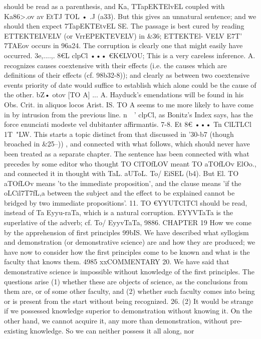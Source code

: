 {{{{{{{{{{{{{{{{{{{{{{{{{{{{{{{{{{{{{{{{{{{{{{{{{{{{{{{{{{{{{{{{{{{{{{{{{should be read as a parenthesis, and Ka, TTapEKTElvEL coupled with
Ka86>.ov av EtTJ TOL • .J (a33). But this gives an unnatural sentence;
and we should then expect 7TapEKTEtvEL SE. The passage is
best cured by reading ETTEKTELVELV (or VrrEPEKTE{VELV) in &36; ETTEKTEl-
VELV E7T' 7TAEov occurs in 96a24. The corruption is clearly one that
might easily have occurred.
3e,....,. 8€L clpCl ••• €K€LVOU; This is a very careless inference.
A. recognizes causes coextensive with their effects (i.e. the causes
which are definitions of their effects (cf. 98b32-8)); and clearly
as between two coextensive events priority of date would suffice
to establish which alone could be the cause of the other.
bZ• otov [TO A] ... A. Hayduck's emendations will be found in
his Obs. Crit. in aliquos locos Arist. IS. TO A seems to me more
likely to have come in by intrusion from the previous line.
n~~' clpCl, as Bonitz's Index says, has the force enunciati
modeste vel dubitanter affirmantis.
7-8. Et 8€ ••• Tn ClLTLCl 1T~"LW. This starts a topic distinct from
that discussed in '30-b7 (though broached in &25--{)) , and connected
with what follows, which should never have been treated as a
separate chapter. The sentence has been connected with what
precedes by some editor who thought TO ClTOfLOV meant TO aTOfLOv
ElOo., and connected it in thought with TaL. aUToL. To/ EiSEL (b4).
But El. TO aTOfLOv means 'to the immediate proposition', and the
clause means 'if the oLCil7T7}fL,a between the subject and the effect
to be explained cannot be bridged by two immediate propositions'.
11. TO €YYUTClTCl should be read, instead of Ta Eyyu-raTa, which
is a natural corruption. EYYVTaTa is the superlative of the adverb;
cf. To/ EyyvTaTa, 9886.
CHAPTER 19
How we come by the apprehension of first principles
99bIS. We have described what syllogism and demonstration
(or demonstrative science) are and how they are produced; we
have now to consider how the first principles come to be known
and what is the faculty that knows them.
4985
xxCOMMENTARY
20. We have said that demonstrative science is impossible
without knowledge of the first principles. The questions arise (1)
whether these are objects of science, as the conclusions from them
are, or of some other faculty, and (2) whether such faculty comes
into being or is present from the start without being recognized.
26. (2) It would be strange if we possessed knowledge superior
to demonstration without knowing it. On the other hand, we
cannot acquire it, any more than demonstration, without pre-
existing knowledge. So we can neither possess it all along, nor
}}}}}}}}}}}}}}}}}}}}}}}}}}}}}}}}}}}}}}}}}}}}}}}}}}}}}}}}}}}}}}}}}}}}}}}}}}
